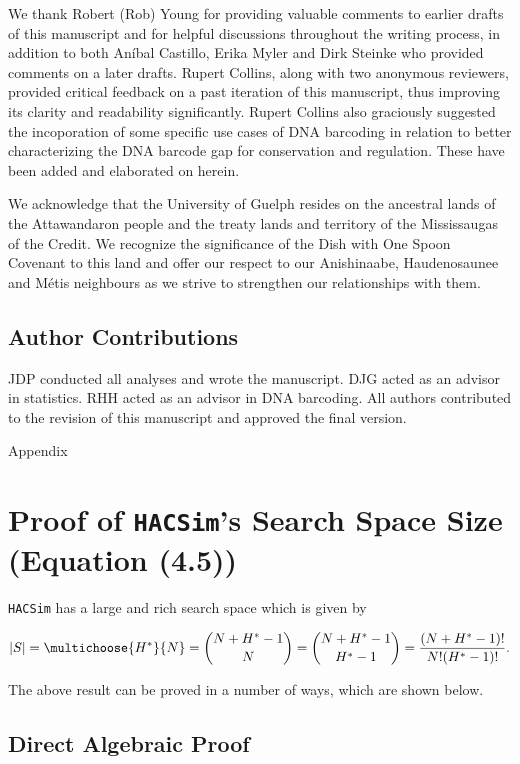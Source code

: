 We thank Robert (Rob) Young for providing valuable comments to earlier drafts of this manuscript and for helpful discussions throughout the writing process, in addition to both An{\'i}bal Castillo, Erika Myler and Dirk Steinke who provided comments on a later drafts. Rupert Collins, along with two anonymous reviewers, provided critical feedback on a past iteration of this manuscript, thus improving its clarity and readability significantly. Rupert Collins also graciously suggested the incoporation of some specific use cases of DNA barcoding in relation to better characterizing the DNA barcode gap for conservation and regulation. These have been added and elaborated on herein. 

We acknowledge that the University of Guelph resides on the ancestral lands of the Attawandaron people and the treaty lands and territory of the Mississaugas of the Credit. We recognize the significance of the Dish with One Spoon Covenant to this land and offer our respect to our Anishinaabe, Haudenosaunee and M{\'e}tis neighbours as we strive to strengthen our relationships with them.

\section*{Author Contributions}

JDP conducted all analyses and wrote the manuscript. DJG acted as an advisor in statistics. RHH acted as an advisor in DNA barcoding. All authors contributed to the revision of this manuscript and approved the final version. 



Appendix

\chapter{Proof of {\tt HACSim}'s Search Space Size (Equation (4.5))}

{\tt HACSim} has a large and rich search space which is given by

\begin{equation}
|S| = \multichoose{H^*}{N} = {{N + H^* - 1}\choose{N}} = {{N + H^* - 1}\choose{H^* - 1}} = \frac{(N + H^* - 1)!}{N!(H^* - 1)!}.
\end{equation}

\noindent The above result can be proved in a number of ways, which are shown below.

\section{Direct Algebraic Proof}

